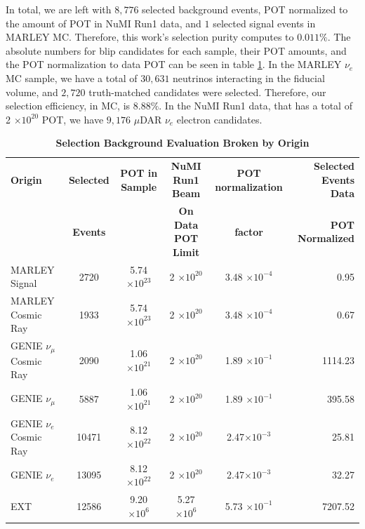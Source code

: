 In total, we are left with $8,776$ selected background events, POT normalized to the amount of POT in NuMI Run1 data, and $1$ selected signal events in MARLEY MC. Therefore, this work's selection purity computes to $0.011\%$. The absolute numbers for blip candidates for each sample, their POT amounts, and the POT normalization to data POT can be seen in table \ref{bkg}. In the MARLEY $\nu_{e}$ MC sample, we have a total of $30,631$ neutrinos interacting in the fiducial volume, and $2,720$ truth-matched candidates were selected. Therefore, our selection efficiency, in MC, is $8.88\%$. In the NuMI Run1 data, that has a total of 2 $\times 10^{20}$ POT, we have $9,176$ $\mu$DAR $\nu_e$ electron candidates.   

\begin{table}[h!]
    \centering
    \begin{scriptsize}
	\begin{tabular}{lccccr}
		\hline
		\textbf{Origin} & \textbf{Selected}	&	\textbf{POT in Sample}	&	\textbf{NuMI Run1 Beam} & \textbf{POT normalization} & \textbf{Selected Events Data}\\
        & \textbf{Events} & & \textbf{On Data POT Limit} & \textbf{factor} & \textbf{POT Normalized}\\
		\toprule
		MARLEY Signal & 2720 & 5.74 $\times 10^{23}$ & 2 $\times 10^{20}$ & 3.48 $\times 10^{-4}$ & 0.95 \\ 
		MARLEY Cosmic Ray & 1933 & 5.74 $\times 10^{23}$ & 2 $\times 10^{20}$ & 3.48 $\times 10^{-4}$ & 0.67 \\
		GENIE  $\nu_{\mu}$ Cosmic Ray &  2090  &  1.06 $\times 10^{21}$  &  2 $\times 10^{20}$ &  1.89 $\times 10^{-1}$ & 1114.23 \\ 
        GENIE  $\nu_{\mu}$ & 5887 & 1.06 $\times 10^{21}$ & 2 $\times 10^{20}$ & 1.89 $\times 10^{-1}$ & 395.58 \\
        GENIE  $\nu_{e}$ Cosmic Ray & 10471 & 8.12 $\times 10^{22}$ & 2 $\times 10^{20}$ & 2.47$\times 10^{-3}$ & 25.81 \\
        GENIE  $\nu_{e}$ & 13095 & 8.12 $\times 10^{22}$ & 2 $\times 10^{20}$ & 2.47$\times 10^{-3}$ & 32.27 \\
        EXT & 12586 & 9.20 $\times 10^{6}$ & 5.27 $\times 10^{6}$ & 5.73 $\times 10^{-1}$ & 7207.52 \\
		\hline
	\end{tabular}
    \end{scriptsize}
	\caption[Selection Background Evaluation]{{\textbf{Selection Background Evaluation Broken by Origin}}}
    \label{bkg}
\end{table}

